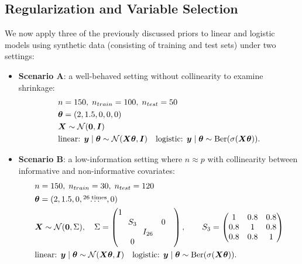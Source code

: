 \subsection{Regularization and Variable Selection}

We now apply three of the previously discussed priors to linear and logistic models using synthetic data (consisting of training and test sets) under two settings:

\begin{itemize}
    \item \textbf{Scenario A}: a well-behaved setting without collinearity to examine shrinkage:
    \begin{equation*}
        \begin{aligned}
            &n = 150,\; n_{train} = 100,\;n_{test} = 50 \\
            &\bm{\theta} = (2, 1.5, 0, 0, 0) \\
            &\bm{X} \sim \mathcal{N}(\bm{0}, \bm{I}) \\
            &\text{linear: } \bm{y} \mid \bm{\theta} \sim \mathcal{N}(\bm{X} \bm{\theta},\bm{I})\quad \text{logistic: } \bm{y} \mid \bm{\theta} \sim \text{Ber}(\sigma(\bm{X} \bm{\theta})).
        \end{aligned}
    \end{equation*}
    \item \textbf{Scenario B}: a low-information setting where $n \approx p$ with collinearity between informative and non-informative covariates:
    \begin{equation*}
        \begin{aligned}
            &n = 150,\; n_{train} = 30,\;n_{test} = 120 \\
            &\bm{\theta} = (2, 1.5, 0, \overset{26\; \text{times}}{\dots}, 0) \\
            &\bm{X} \sim \mathcal{N}(\bm{0}, \Sigma), \quad \Sigma =
                    \begin{pmatrix}
                    1 &        &         &        &        \\
                        & \!\!S_3\!\! &        & 0      &        \\
                        &        & I_{26} &        &        \\
                        & 0      &        &        &        \\
                    \end{pmatrix},
                    \qquad
                    S_3 = 
                    \begin{pmatrix}
                    1   & 0.8 & 0.8\\
                    0.8 & 1   & 0.8\\
                    0.8 & 0.8 & 1
                    \end{pmatrix}\\
            &\text{linear: } \bm{y} \mid \bm{\theta} \sim \mathcal{N}(\bm{X} \bm{\theta}, \bm{I})\quad \text{logistic: } \bm{y} \mid \bm{\theta} \sim \text{Ber}(\sigma(\bm{X} \bm{\theta})).
        \end{aligned}
    \end{equation*}
\end{itemize}

